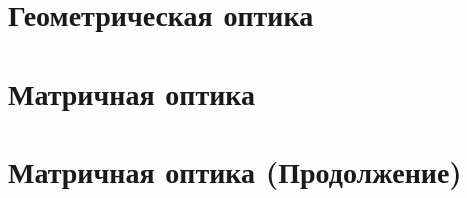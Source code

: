 


\section{Геометрическая оптика}

\newpage 

\section{Матричная оптика}


\section{Матричная оптика (Продолжение)}



